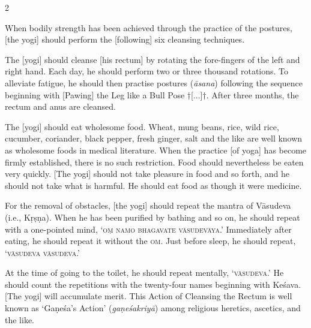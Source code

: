 \null\vspace{0.1cm}
\begin{nohyp}
\begin{eng}
\end{eng}


\begin{multicols}{2}
\begin{eng}
When bodily strength has been achieved through the practice of the postures, [the yogi] should perform the [following] six cleansing techniques.
\vskip 7pt


The [yogi] should cleanse [his rectum] by rotating the fore-fingers of the left and right hand. Each day, he should perform two or three thousand rotations. To alleviate fatigue, he should then practise postures (\textit{āsana}) following the sequence beginning with [Pawing] the Leg like a Bull Pose $\dagger$[...]$\dagger$. After three months, the rectum and anus are cleansed.

The [yogi] should eat wholesome food. Wheat, mung beans, rice, wild rice, cucumber, coriander, black pepper, fresh ginger, salt and the like are well known as wholesome foods in medical literature. When the practice [of yoga] has become firmly established, there is no such restriction. Food should nevertheless be eaten very quickly. [The yogi] should not take pleasure in food and so forth, and he should not take what is harmful. He should eat food as though it were medicine.\label{food}

For the removal of obstacles, [the yogi] should repeat the mantra of Vāsudeva (i.e., Kṛṣṇa). When he has been purified by bathing and so on, he should repeat with a one-pointed mind, `\textsc{oṃ namo bhagavate vāsudevāya}.' Immediately after eating, he should repeat it without the \textsc{om}. Just before sleep, he should repeat, `\textsc{vāsudeva vāsudeva}.' 

At the time of going to the toilet, he should repeat mentally, `\textsc{vāsudeva}.' He should count the repetitions with the twenty-four names beginning with Keśava. [The yogi] will accumulate merit. This Action of Cleansing the Rectum is well known as `Gaṇeśa’s Action' (\textit{gaṇeśa\-kriyā}) among religious heretics, ascetics, and the like.
\vskip 7pt


\end{eng}
\end{multicols}
\end{nohyp}
